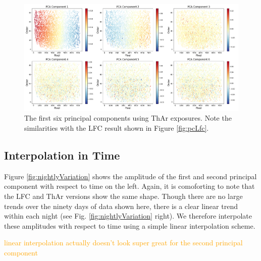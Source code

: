 \documentclass[12pt, letterpaper]{article}
\newcommand{\lz}[1]{\textcolor{orange}{#1}}
\begin{document}
\begin{figure}[t!]
\centering
\includegraphics[width=\textwidth]{Figures/pcsThar6.png}
\caption{The first six principal components using ThAr exposures.  Note the similarities with the LFC result shown in Figure \ref{fig:pcLfc}.}
\label{fig:pcThar}
\end{figure}

\subsection{Interpolation in Time}
Figure \ref{fig:nightlyVariation} shows the amplitude of the first and second principal component with respect to time on the left.  Again, it is comoforting to note that the LFC and ThAr versions show the same shape.  Though there are no large trends over the ninety days of data shown here, there is a clear linear trend within each night (see Fig. \ref{fig:nightlyVariation} right).  We therefore interpolate these amplitudes with respect to time using a simple linear interpolation scheme.

\lz{linear interpolation actually doesn't look super great for the second principal component}
\end{document}
